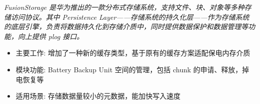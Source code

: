 \documentclass{resume}
\begin{document}
\textit{FusionStorage 是华为推出的一款分布式存储系统，支持文件、块、对象等多种存储访问协议。其中 Persistence Layer——存储系统的持久化层——作为存储系统的底层引擎，负责将数据持久化到存储介质中，同时提供数据保护和数据管理等功能，向上提供 plog 接口。}
\begin{onehalfspacing}
\begin{itemize}
  \item 主要工作: 增加了一种新的缓存类型，基于原有的缓存方案适配保电内存介质
  \item 模块功能: Battery Backup Unit 空间的管理，包括 chunk 的申请、释放，掉电恢复等
  \item 适用场景: 存储数据量较小的元数据，能加快写入速度
\end{itemize}
\end{onehalfspacing}
\end{document}
